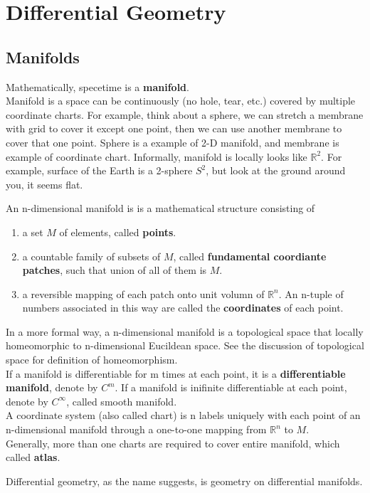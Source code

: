 \documentclass[12pt]{article}
\theoremstyle{mystyle}{\newtheorem{definition}{Definition}[section]}
\theoremstyle{mystyle}{\newtheorem{theorem}[definition]{Theorem}}
\theoremstyle{mystyle}{\newtheorem*{remark}{Remark}}
\theoremstyle{mystyle}{\newtheorem*{example}{Example}}
\theoremstyle{mystyle}{\newtheorem*{examples}{Examples}}
\theoremstyle{cstyle}{\newtheorem*{cthm}{}}
\begin{document}
\newpage

\section{Differential Geometry}

\subsection{Manifolds}
Mathematically, specetime is a \textbf{manifold}.\\
Manifold is a space can be continuously (no hole, tear, etc.) covered by multiple coordinate charts.
For example, think about a sphere, we can stretch a membrane with grid to cover it except one point, then we can
use another membrane to cover that one point. Sphere is a example of 2-D manifold, and membrane is example of coordinate chart.
Informally, manifold is locally looks like \(\mathbb{R}^2\).
For example, surface of the Earth is a 2-sphere $S^2$, but look at the ground around you, it seems flat.
\begin{definition}
  An n-dimensional manifold is is a mathematical structure consisting of
  \begin{enumerate}
    \item a set \(M\) of elements, called \textbf{points}.
    \item a countable family of subsets of \(M\), called \textbf{fundamental coordiante patches},
          such that union of all of them is \(M\).
    \item a reversible mapping of each patch onto unit volumn of \(\mathbb{R}^n\). An n-tuple of numbers associated
          in this way are called the \textbf{coordinates} of each point.
  \end{enumerate}
  In a more formal way, a n-dimensional manifold is a topological space that locally homeomorphic to n-dimensional Eucildean space.
  See the discussion of topological space for definition of homeomorphism.\\
  If a manifold is differentiable for m times at each point, it is a \textbf{differentiable manifold}, denote by \(C^m\).
  If a manifold is inifinite differentiable at each point, denote by \(C^\infty\), called smooth manifold.\\
  A coordinate system (also called chart) is n labels uniquely with each point of an n-dimensional manifold through a one-to-one mapping from
  $\mathbb{R}^n$ to $M$.\\
  Generally, more than one charts are required to cover entire manifold, which called \textbf{atlas}.
\end{definition}
Differential geometry, as the name suggests, is geometry on differential manifolds.
\end{document}
